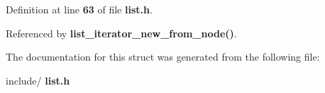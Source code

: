 Definition at line \textbf{ 63} of file \textbf{ list.\+h}.



Referenced by \textbf{ list\+\_\+iterator\+\_\+new\+\_\+from\+\_\+node()}.



The documentation for this struct was generated from the following file\+:\begin{DoxyCompactItemize}
\item 
include/\textbf{ list.\+h}\end{DoxyCompactItemize}
